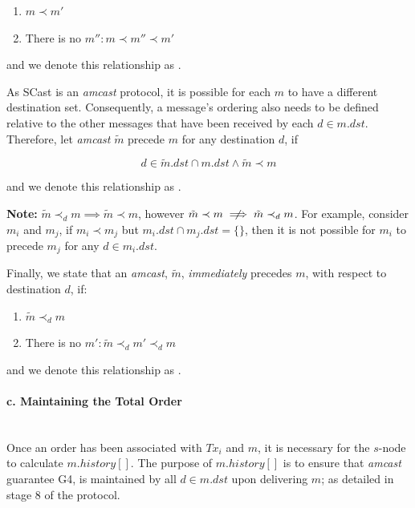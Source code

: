 \begin{enumerate}
        \begin{enumerate}[label={(\roman*)}, leftmargin=5em]
            \item    $m \prec m'$
            \item    There is no $m'' : m \prec m'' \prec m'$
        \end{enumerate}

        and we denote this relationship as .  
        
        As \textsf{SCast} is an \emph{amcast} protocol, it is possible for each $m$ to have a different destination set.  Consequently, a message's ordering also needs to be defined relative to the other messages that have been received by each $d \in m.dst$.  Therefore, let \emph{amcast} $\tilde{m}$ precede $m$ for any destination $d$, if
        
        \begin{equation*}
            d \in \tilde{m}.dst \cap m.dst \land \tilde{m} \prec m
        \end{equation*}
        
        and we denote this relationship as  .  
        
        \textbf{Note: } $\tilde{m} \prec_d m \implies  \tilde{m} \prec m$, however $\tilde{m} \prec m \centernot\implies \tilde{m} \prec_d m$.  For example, consider $m_i$ and $m_j$, if $m_i \prec m_j$ but $m_i.dst \cap m_j.dst = \{\}$, then it is not possible for $m_i$ to precede $m_j$ for any $d \in m_i.dst$.  
        
        Finally, we state that an \emph{amcast}, $\tilde{m}$, \emph{immediately} precedes $m$, with respect to destination $d$, if:

        \begin{enumerate}[label={(\roman*)}, leftmargin=5em]
            \item    $\tilde{m} \prec_d m$
            \item    There is no $m' : \tilde{m} \prec_d m' \prec_d m$
        \end{enumerate}
        
        and we denote this relationship as .  
        
        \paragraph{c. Maintaining the Total Order} \hfill \\
         Once an order has been associated with $Tx_i$ and $m$, it is necessary for the $s$-node to calculate $m.history[]$.  The purpose of $m.history[]$ is to ensure that \emph{amcast} guarantee G4, is maintained by all $d \in m.dst$ upon delivering $m$; as detailed in stage $8$ of the protocol.  
         

\end{enumerate}
